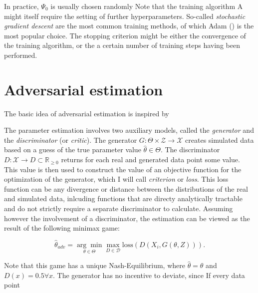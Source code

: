 In practice, $\Psi_0$ is usually chosen randomly
Note that the training algorithm A might itself require the setting of further hyperparameters.
So-called \textit{stochastic gradient descent} are the most common training methods, of which Adam (\cite{diederik2014adam}) is the most popular choice. %
The stopping criterion might be either the convergence of the training algorithm, or the a certain number of training steps having been performed.

\section{Adversarial estimation}
\label{sec:adversarial_estimation}

The basic idea of adversarial estimation is inspired by 

The parameter estimation involves two auxiliary models, called the \textit{generator} and the \textit{discriminator} (or \textit{critic}).
The generator $G : \Theta \times \mathcal{Z} \rightarrow \mathcal{X}$ creates simulated data based on a guess of the true parameter value $\hat{\theta} \in \Theta$.
The discriminator $D : \mathcal{X} \rightarrow D \subset \mathbb{R}_{\geq 0}$ returns for each real and generated data point some value.
This value is then used to construct the value of an objective function for the optimization of the generator, which I will call \textit{criterion} or \textit{loss}.
This loss function can be any divergence or distance between the distributions of the real and simulated data, inlcuding functions that are directy analytically tractable and do not strictly require a separate discriminator to calculate. %
Assuming however the involvement of a discriminator, the estimation can be viewed as the result of the following minimax game:

\begin{equation}
    \label{eq:adversarial_estimator}
        \hat{\theta}_{adv} = \underset{\theta \in \Theta}{\arg \min } \max _{D \in \mathcal{D}} \text{loss}(D(X_i, G(\theta, Z))).
\end{equation}

Note that this game has a unique Nash-Equilibrium, where $\hat{\theta} = \theta$ and $D(x) = 0.5 \forall x$.
The generator has no incentive to deviate, since %
If every data point 


